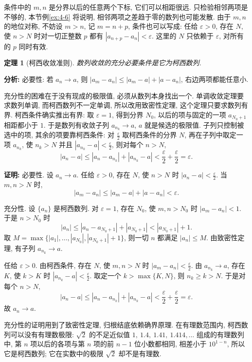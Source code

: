 \documentclass[UTF8,openany]{ctexbook}
\theoremstyle{chinesetextbook}
\newtheorem{theorem}{定理}[section]
\newenvironment{cnproof}{\par\indent\textbf{证明:} \ignorespaces}{\par}
\begin{document}
条件中的 $m,n$ 是分界以后的任意两个下标, 它们可以相距很远. 只检验相邻两项是不够的, 本节例\ref{ex:4-6} 将说明, 相邻两项之差趋于零的数列也可能发散. 由于 $m,n$ 的地位对称, 不妨设 $m>n$, 记 $m=n+p$, 条件也可以写成: 任给 $\varepsilon>0$, 存在 $N$, 使 $n>N$ 时对一切正整数 $p$ 都有 $|a_{n+p}-a_n|<\varepsilon$. 这里的 $N$ 只依赖于 $\varepsilon$, 对所有的 $p$ 同时有效.
\begin{theorem}[柯西收敛准则]
数列收敛的充分必要条件是它为柯西数列.
\end{theorem}
\par\indent\textbf{分析:} 必要性: 若 $a_n\to a$, 则 $|a_m-a_n|\le|a_m-a|+|a-a_n|$, 右边两项都能任意小.

充分性的困难在于没有现成的极限值, 必须从数列本身找出一个. 单调收敛定理要求数列单调, 而柯西数列不一定单调, 所以改用致密性定理, 这个定理只要求数列有界. 柯西条件确实推出有界: 取 $\varepsilon=1$, 得到分界 $N_0$, 以后的项与固定的一项 $a_{N_0+1}$ 相距都小于 $1$. 于是数列有收敛子列 $a_{n_k}\to a$, $a$ 就是候选的极限值. 子列只控制被选中的项, 其余的项要靠柯西条件: 对 $\displaystyle\frac\varepsilon2$ 取柯西条件的分界 $N$, 再在子列中取定一项 $a_{n_k}$, 使 $n_k>N$ 并且 $\displaystyle|a_{n_k}-a|<\frac\varepsilon2$, 则对每个 $n>N$,
\[
|a_n-a|\le|a_n-a_{n_k}|+|a_{n_k}-a|<\frac\varepsilon2+\frac\varepsilon2=\varepsilon.
\]
\begin{cnproof}
必要性. 设 $a_n\to a$. 任给 $\varepsilon>0$, 存在 $N$, 使 $n>N$ 时 $\displaystyle|a_n-a|<\frac\varepsilon2$. 当 $m,n>N$ 时,
\[
|a_m-a_n|\le|a_m-a|+|a-a_n|<\varepsilon.
\]

充分性. 设 $\{a_n\}$ 是柯西数列. 对 $\varepsilon=1$, 存在 $N_0$, 使 $m,n>N_0$ 时 $|a_m-a_n|<1$. 于是 $n>N_0$ 时
\[
|a_n|\le|a_n-a_{N_0+1}|+|a_{N_0+1}|<|a_{N_0+1}|+1.
\]
取 $M=\max\{|a_1|,\ldots,|a_{N_0}|,|a_{N_0+1}|+1\}$, 则一切 $n$ 都满足 $|a_n|\le M$. 由致密性定理, 有子列 $a_{n_k}\to a$.

任给 $\varepsilon>0$. 由柯西条件, 存在 $N$, 使 $m,n>N$ 时 $\displaystyle|a_m-a_n|<\frac\varepsilon2$. 由 $a_{n_k}\to a$, 存在 $K$, 使 $k>K$ 时 $\displaystyle|a_{n_k}-a|<\frac\varepsilon2$. 取定一个 $k>\max\{K,N\}$, 则 $n_k\ge k>N$. 于是对每个 $n>N$,
\[
|a_n-a|\le|a_n-a_{n_k}|+|a_{n_k}-a|<\frac\varepsilon2+\frac\varepsilon2=\varepsilon.
\]
故 $a_n\to a$.
\end{cnproof}
充分性的证明用到了致密性定理, 归根结底依赖确界原理. 在有理数范围内, 柯西数列可以没有有理数极限: $\sqrt2$ 的不足近似值 $1,\ 1.4,\ 1.41,\ 1.414,\ldots$ 组成的有理数列中, 第 $n$ 项以后的各项与第 $n$ 项的前 $n-1$ 位小数都相同, 相差小于 $10^{1-n}$, 所以它是柯西数列; 它在实数中的极限 $\sqrt2$ 却不是有理数.
\end{document}

